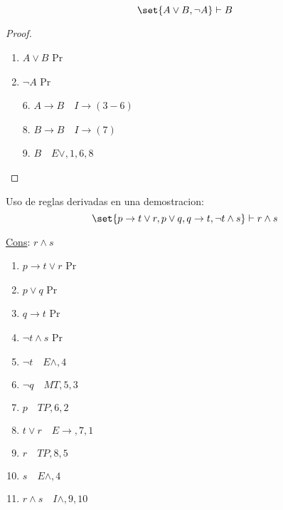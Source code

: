 \begin{theorem}
	\[
		\set{A \vee B, \neg A} \vdash B
	\]
\end{theorem}
\begin{proof}~
	\begin{enumerate}
		\item \(A \vee B \) Pr
		\item \(\neg A \) Pr
	\end{enumerate}
	\begin{enumerate}
		\item[6.] \(A \to B \quad I\to(3-6)\)
	\end{enumerate}
	\begin{enumerate}
		\item[8.] \(B \to B \quad I\to(7)\)
		\item[9.] \(B \quad E\vee, 1, 6, 8\)
	\end{enumerate}
\end{proof}

\begin{example}
	Uso de reglas derivadas en una demostracion:
	\[
		\set{p \to t \vee r, p \vee  q, q \to t, \neg t \wedge s} \vdash r \wedge s
	\]

	\underline{Cons}: \(r \wedge s \)
	\begin{enumerate}
		\item \(p \to t \vee  r \) Pr
		\item \(p \vee  q \) Pr
		\item \(q \to t \) Pr
		\item \(\neg t \wedge s \) Pr
		\item \(\neg t \quad E \wedge ,4\)
		\item \(\neg q \quad MT,5,3 \)
		\item \(p \quad TP, 6,2 \)
		\item \(t \vee r \quad E\to,7,1\)
		\item \(r \quad TP,8,5 \)
		\item \(s \quad E \wedge,4 \)
		\item \(r \wedge  s \quad I\wedge,9,10\)
	\end{enumerate}
\end{example}

